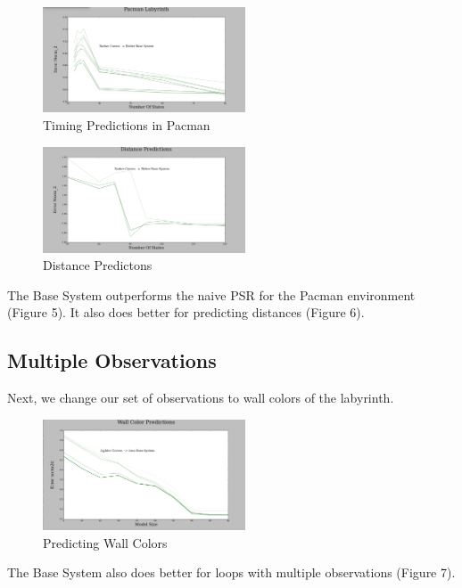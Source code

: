 \documentclass{acm_proc_article-sp}
\begin{document}
\begin{figure}[ht!]
\centering
\includegraphics[width=60mm]{lucasplots/monImages/PacmanLabyrinth.png}
\caption{Timing Predictions in Pacman \label{overflow}}
\end{figure}

\begin{figure}[ht!]
\centering
\includegraphics[width=60mm]{lucasplots/monImages/Distance_Predictions.png}
\caption{Distance Predictons\label{overflow}}
\end{figure}

The Base System outperforms the naive PSR for the Pacman environment (Figure 5). It also does better for predicting distances (Figure 6). 

\subsection{Multiple Observations}

Next, we change our set of observations to wall colors of the labyrinth. 

\begin{figure}[ht!]
\centering
\includegraphics[width=60mm]{lucasplots/monImages/WallColorPredictions.png}
\caption{Predicting Wall Colors \label{overflow}}
\end{figure}

The Base System also does better for loops with multiple observations (Figure 7).

\end{document}
